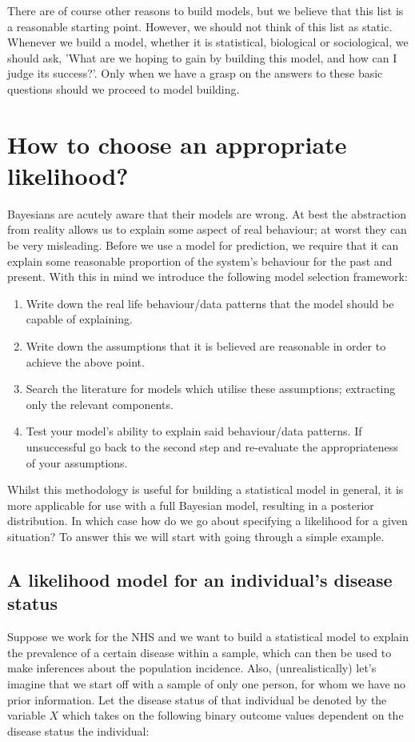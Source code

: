 \documentclass[11pt,fullpage]{book}
\begin{document}
There are of course other reasons to build models, but we believe that this list is a reasonable starting point. However, we should not think of this list as static. Whenever we build a model, whether it is statistical, biological or sociological, we should ask, 'What are we hoping to gain by building this model, and how can I judge its success?'. Only when we have a grasp on the answers to these basic questions should we proceed to model building.

\section{How to choose an appropriate likelihood?}\label{sec:chooseLikelihood}
Bayesians are acutely aware that their models are wrong. At best the abstraction from reality allows us to explain some aspect of real behaviour; at worst they can be very misleading. Before we use a model for prediction, we require that it can explain some reasonable proportion of the system's behaviour for the past and present. With this in mind we introduce the following model selection framework:

\begin{enumerate}
\item Write down the real life behaviour/data patterns that the model should be capable of explaining.
\item Write down the assumptions that it is believed are reasonable in order to achieve the above point.
\item Search the literature for models which utilise these assumptions; extracting only the relevant components.
\item Test your model's ability to explain said behaviour/data patterns. If unsuccessful go back to the second step and re-evaluate the appropriateness of your assumptions.
\end{enumerate}

Whilst this methodology is useful for building a statistical model in general, it is more applicable for use with a full Bayesian model, resulting in a posterior distribution. In which case how do we go about specifying a likelihood for a given situation? To answer this we will start with going through a simple example.

\subsection{A likelihood model for an individual's disease status}\label{sec:Likelihood_individualDisease}
Suppose we work for the NHS and we want to build a statistical model to explain the prevalence of a certain disease within a sample, which can then be used to make inferences about the population incidence. Also, (unrealistically) let's imagine that we start off with a sample of only one person, for whom we have no prior information. Let the disease status of that individual be denoted by the variable $X$ which takes on the following binary outcome values dependent on the disease status the individual:
\end{document}
